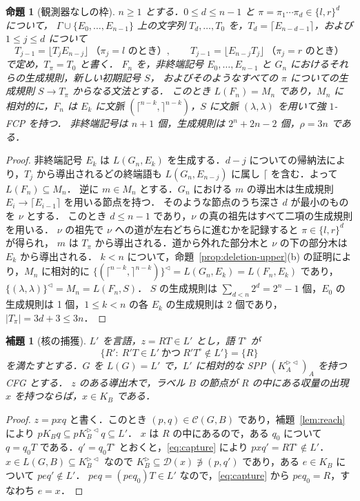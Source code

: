 \documentclass[11pt,a4paper]{ltjsarticle}
\numberwithin{equation}{section}
\theoremstyle{plain}
\newtheorem{lemma}[theorem]{補題}
\newtheorem{proposition}[theorem]{命題}
\theoremstyle{definition}
\theoremstyle{remark}
\theoremstyle{plain}
\newcommand{\eps}{\lambda}
\newcommand{\R}{^{\rhd}}
\newcommand{\Lc}{^{\lhd}}
\newcommand{\RL}{^{\rhd\lhd}}
\newcommand{\D}{\mathcal D}
\newcommand{\Lfl}{\lfloor}
\newcommand{\Rfl}{\rfloor}
\newcommand{\Lce}{\lceil}
\newcommand{\Rce}{\rceil}
\begin{document}
\begin{proposition}[観測器なしの枠]\label{prop:untyped-frames}
$n\ge1$ とする．$0\le d\le n-1$ と $\pi=\pi_1\cdots\pi_d\in\{l,r\}^d$ について，
$\Gamma\cup\{E_0,\dots,E_{n-1}\}$ 上の文字列 $T_d,\dots,T_0$ を，$T_d=\Lce E_{n-d-1}\Rce$，および $1\le j\le d$ について
\[
T_{j-1}=\Lfl T_jE_{n-j}\Rfl\ \text{（}\pi_j=l\text{ のとき）},\qquad
T_{j-1}=\Lfl E_{n-j}T_j\Rfl\ \text{（}\pi_j=r\text{ のとき）}
\]
で定め，$T_\pi=T_0$ と書く．
$F_n$ を，非終端記号 $E_0,\dots,E_{n-1}$ と $G_n$ におけるそれらの生成規則，新しい初期記号 $S$，
およびそのようなすべての $\pi$ についての生成規則 $S\to T_\pi$ からなる文法とする．
このとき $L(F_n)=M_n$ であり，$M_n$ に相対的に，$F_n$ は $E_k$ に文脈 $(\Lce^{n-k},\Rce^{n-k})$，$S$ に文脈 $(\eps,\eps)$ を用いて強 $1$-FCP を持つ．
非終端記号は $n+1$ 個，生成規則は $2^n+2n-2$ 個，$\rho=3n$ である．
\end{proposition}
\begin{proof}
非終端記号 $E_k$ は $L(G_n,E_k)$ を生成する．$d-j$ についての帰納法により，$T_j$ から導出されるどの終端語も
$L(G_n,E_{n-j})$ に属し $\Lce$ を含む．よって $L(F_n)\subseteq M_n$．
逆に $m\in M_n$ とする．$G_n$ における $m$ の導出木は生成規則 $E_i\to\Lce E_{i-1}\Rce$ を用いる節点を持つ．
そのような節点のうち深さ $d$ が最小のものを $\nu$ とする．
このとき $d\le n-1$ であり，$\nu$ の真の祖先はすべて二項の生成規則を用いる．
$\nu$ の祖先で $\nu$ への道が左右どちらに進むかを記録すると $\pi\in\{l,r\}^d$ が得られ，
$m$ は $T_\pi$ から導出される．道から外れた部分木と $\nu$ の下の部分木は $E_k$ から導出される．
$k<n$ について，命題~\ref{prop:deletion-upper}(b) の証明により，$M_n$ に相対的に
$\{(\Lce^{n-k},\Rce^{n-k})\}\Lc=L(G_n,E_k)=L(F_n,E_k)$ であり，$\{(\eps,\eps)\}\Lc=M_n=L(F_n,S)$．
$S$ の生成規則は $\sum_{d<n}2^d=2^n-1$ 個，$E_0$ の生成規則は 1 個，$1\le k<n$ の各 $E_k$ の生成規則は 2 個であり，
$|T_\pi|=3d+3\le3n$．
\end{proof}

\begin{lemma}[核の捕獲]\label{lem:capture}
$L'$ を言語，$z=RT\in L'$ とし，語 $T^\circ$ が
\begin{equation}\label{eq:capture}
\{R':\ R'T\in L'\ \text{かつ}\ R'T^\circ\notin L'\}=\{R\}
\end{equation}
を満たすとする．$G$ を $L(G)=L'$ で，$L'$ に相対的な SPP $(K_A\RL)_A$ を持つ CFG とする．
$z$ のある導出木で，ラベル $B$ の節点が $R$ の中にある収量の出現 $x$ を持つならば，$x\in K_B$ である．
\end{lemma}
\begin{proof}
$z=pxq$ と書く．このとき $(p,q)\in\mathcal C(G,B)$ であり，補題~\ref{lem:reach} により $pK_Bq\subseteq pK_B\RL q\subseteq L'$．
$x$ は $R$ の中にあるので，ある $q_0$ について $q=q_0T$ である．$q'=q_0T^\circ$ とおくと，\eqref{eq:capture} により $pxq'=RT^\circ\notin L'$．
$x\in L(G,B)\subseteq K_B\RL$ なので $K_B\R\subseteq\D(x)\not\ni(p,q')$ であり，ある $e\in K_B$ について $peq'\notin L'$．
$peq=(peq_0)T\in L'$ なので，\eqref{eq:capture} から $peq_0=R$，すなわち $e=x$．
\end{proof}
\end{document}

